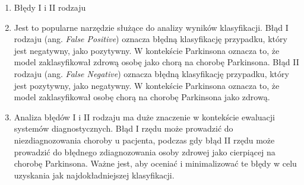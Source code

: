 \begin{enumerate}[label={\alph*)}]
    \item Błędy I i II rodzaju
    \item [] Jest to popularne narzędzie służące do analizy wyników klasyfikacji.
    Błąd I rodzaju (ang. \emph{False Positive}) oznacza błędną klasyfikację przypadku, który jest negatywny, jako pozytywny.
    W kontekście Parkinsona oznacza to, że model zaklasyfikował zdrową osobę jako chorą na chorobę Parkinsona.
    Błąd II rodzaju (ang. \emph{False Negative}) oznacza błędną klasyfikację przypadku, który jest pozytywny, jako negatywny.
    W kontekście Parkinsona oznacza to, że model zaklasyfikował osobę chorą na chorobę Parkinsona jako zdrową.

    \item [] Analiza błędów I i II rodzaju ma duże znaczenie w kontekście ewaluacji systemów diagnostycznych.
    Błąd I rzędu może prowadzić do niezdiagnozowania choroby u pacjenta, podczas gdy błąd II rzędu może prowadzić do błędnego zdiagnozowania osoby zdrowej jako cierpiącej na chorobę Parkinsona.
    Ważne jest, aby oceniać i minimalizować te błędy w celu uzyskania jak najdokładniejszej klasyfikacji.


\end{enumerate}
